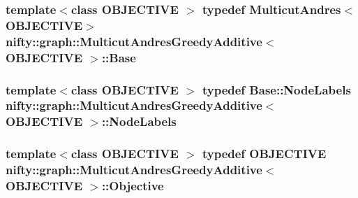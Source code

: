 \subsubsection[{Base}]{\setlength{\rightskip}{0pt plus 5cm}template$<$class O\+B\+J\+E\+C\+T\+I\+V\+E $>$ typedef {\bf Multicut\+Andres}$<$O\+B\+J\+E\+C\+T\+I\+V\+E$>$ {\bf nifty\+::graph\+::\+Multicut\+Andres\+Greedy\+Additive}$<$ O\+B\+J\+E\+C\+T\+I\+V\+E $>$\+::{\bf Base}}\label{classnifty_1_1graph_1_1MulticutAndresGreedyAdditive_a2f59fb0e8499bc661dad779a9acf28ba}
\hypertarget{classnifty_1_1graph_1_1MulticutAndresGreedyAdditive_acc7e717594fc4820cda56feb3c000fa1}{}
\subsubsection[{Node\+Labels}]{\setlength{\rightskip}{0pt plus 5cm}template$<$class O\+B\+J\+E\+C\+T\+I\+V\+E $>$ typedef {\bf Base\+::\+Node\+Labels} {\bf nifty\+::graph\+::\+Multicut\+Andres\+Greedy\+Additive}$<$ O\+B\+J\+E\+C\+T\+I\+V\+E $>$\+::{\bf Node\+Labels}}\label{classnifty_1_1graph_1_1MulticutAndresGreedyAdditive_acc7e717594fc4820cda56feb3c000fa1}
\hypertarget{classnifty_1_1graph_1_1MulticutAndresGreedyAdditive_ab5aa303a6a8d2f058abb4771c9f484f0}{}
\subsubsection[{Objective}]{\setlength{\rightskip}{0pt plus 5cm}template$<$class O\+B\+J\+E\+C\+T\+I\+V\+E $>$ typedef O\+B\+J\+E\+C\+T\+I\+V\+E {\bf nifty\+::graph\+::\+Multicut\+Andres\+Greedy\+Additive}$<$ O\+B\+J\+E\+C\+T\+I\+V\+E $>$\+::{\bf Objective}}\label{classnifty_1_1graph_1_1MulticutAndresGreedyAdditive_ab5aa303a6a8d2f058abb4771c9f484f0}
\hypertarget{classnifty_1_1graph_1_1MulticutAndresGreedyAdditive_af4a079ac6b02b63260a05440414ed4f9}{}
